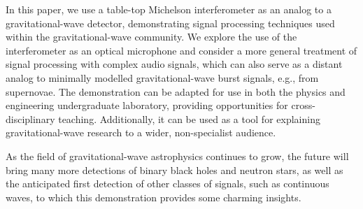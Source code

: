 \documentclass[paper-main.tex]{subfiles}
\begin{document}
In this paper, we use a table-top Michelson interferometer as an analog to a gravitational-wave detector, demonstrating signal processing techniques used within the gravitational-wave community.
We explore the use of the interferometer as an optical microphone and consider a more general treatment of signal processing with complex audio signals, which can also serve as a distant analog to minimally modelled gravitational-wave burst signals, e.g., from supernovae.
The demonstration can be adapted for use in both the physics and engineering undergraduate laboratory, providing opportunities for cross-disciplinary teaching. 
Additionally, it can be used as a tool for explaining gravitational-wave research to a wider, non-specialist audience. 


As the field of gravitational-wave astrophysics continues to grow, the future will bring many more detections of binary black holes and neutron stars, as well as the anticipated first detection of other classes of signals, such as continuous waves, to which this demonstration provides some charming insights. 
\end{document}
